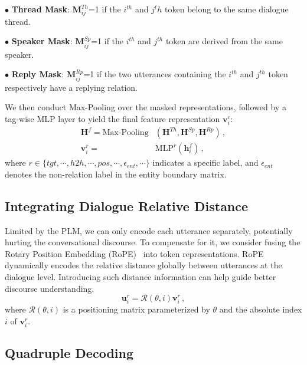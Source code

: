 \documentclass[11pt]{article}
\begin{document}
\vspace{2pt}
$\bullet$ \textbf{Thread Mask}: $\bm{M}^{Th}_{ij}$=1 if the $i^{th}$ and $j^th$ token belong to the same dialogue thread.

\vspace{2pt}
$\bullet$ \textbf{Speaker Mask}: $\bm{M}^{Sp}_{ij}$=1 if the $i^{th}$ and $j^{th}$ token are derived from the same speaker.

\vspace{2pt}
$\bullet$ \textbf{Reply Mask}: $\bm{M}^{Rp}_{ij}$=1 if the two utterances containing the $i^{th}$ and $j^{th}$ token respectively have a replying relation.

We then conduct Max-Pooling over the masked representations, followed by a tag-wise MLP layer to yield the final feature representation $\bm{v}^c_i$:
\begin{align}
    \bm{H}^f = \text{Max-Pooling}&(\bm{H}^{Th}, \bm{H}^{Sp}, \bm{H}^{Rp}) \,, \\
 \label{eq_dense}  \bm{v}^r_i = &\text{MLP}^r(\bm{h}^f_i) \,,
\end{align}
where $r\in\{tgt,\cdots,h2h,\cdots,pos,\cdots,\epsilon_{ent},\cdots\}$ indicates a specific label, and $\epsilon_{ent}$ denotes the non-relation label in the entity boundary matrix.

\vspace{-2pt}
\subsection{Integrating Dialogue Relative Distance}

Limited by the PLM, we can only encode each utterance separately, potentially hurting the conversational discourse.
To compensate for it, we consider fusing the Rotary Position Embedding (RoPE)~\cite{abs-2104-09864} into token representations.
RoPE dynamically encodes the relative distance globally between utterances at the dialogue level.
Introducing such distance information can help guide better discourse understanding. 
\begin{equation}
  \bm{u}^r_i = \boldsymbol{\mathcal{R}}(\theta, i) \bm{v}^r_i \,,
  \label{eq.rope}
\end{equation}
where 
$\boldsymbol{\mathcal{R}}(\theta, i)$ is a positioning matrix parameterized by $\theta$ and the absolute index $i$ of $\bm{v}^r_i$.

\vspace{-2pt}
\subsection{Quadruple Decoding}
\end{document}
